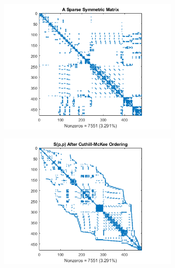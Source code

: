 \begin{figure}
    \centering
    \begin{subfigure}{0.49\textwidth}
        \includegraphics[width=\textwidth]{Figures/sparsity_unordered}
    \end{subfigure} \hfill
    \begin{subfigure}{0.49\textwidth}
        \includegraphics[width=\textwidth]{Figures/sparsity_cmckee}
    \end{subfigure} \\
    \begin{subfigure}{0.49\textwidth}

\end{subfigure}
\end{figure}
